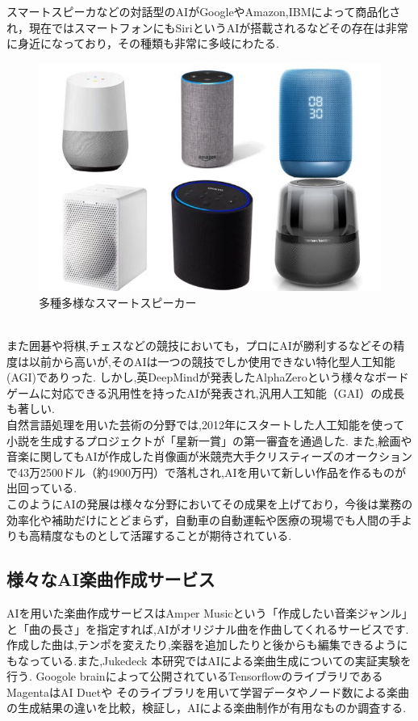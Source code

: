 スマートスピーカなどの対話型のAIがGoogleやAmazon,IBMによって商品化され，現在ではスマートフォンにもSiriというAIが搭載されるなどその存在は非常に身近になっており，その種類も非常に多岐にわたる.
\begin{figure}[!ht]
    \begin{screen}
    \begin{center}
        \includegraphics[scale=0.6, clip]{./img/smartspeaker_list.jpg}
        \caption{多種多様なスマートスピーカー}
        \label{fig:多種多様なスマートスピーカー}
    \end{center}
\end{screen}
\end{figure}\\
また囲碁や将棋,チェスなどの競技においても，プロにAIが勝利するなどその精度は以前から高いが,そのAIは一つの競技でしか使用できない特化型人工知能(AGI)でありった.
しかし,英DeepMindが発表したAlphaZeroという様々なボードゲームに対応できる汎用性を持ったAIが発表され,汎用人工知能（GAI）の成長も著しい.\\
自然言語処理を用いた芸術の分野では,2012年にスタートした人工知能を使って小説を生成するプロジェクトが「星新一賞」の第一審査を通過した.
また,絵画や音楽に関してもAIが作成した肖像画が米競売大手クリスティーズのオークションで43万2500ドル（約4900万円）で落札され,AIを用いて新しい作品を作るものが出回っている.\\
このようにAIの発展は様々な分野においてその成果を上げており，今後は業務の効率化や補助だけにとどまらず，自動車の自動運転や医療の現場でも人間の手よりも高精度なものとして活躍することが期待されている.
\subsection{様々なAI楽曲作成サービス}
AIを用いた楽曲作成サービスはAmper Musicという「作成したい音楽ジャンル」と「曲の長さ」を指定すれば,AIがオリジナル曲を作曲してくれるサービスです. 作成した曲は,テンポを変えたり,楽器を追加したりと後からも編集できるようにもなっている.また,Jukedeck
本研究ではAIによる楽曲生成についての実証実験を行う.
Googole brainによって公開されているTensorflowのライブラリであるMagentaはAI Duetや
そのライブラリを用いて学習データやノード数による楽曲の生成結果の違いを比較，検証し，AIによる楽曲制作が有用なものか調査する.\\
